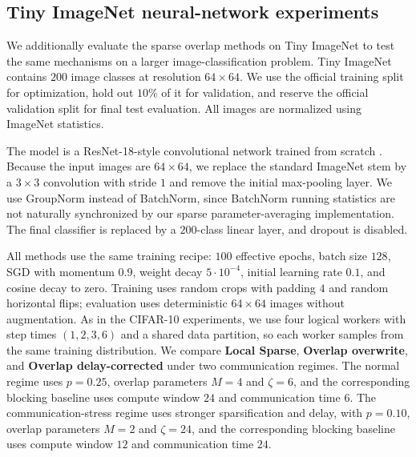 \documentclass{article}
\theoremstyle{plain}
\theoremstyle{definition}
\begin{document}
\subsection{Tiny ImageNet neural-network experiments}
\label{subsec:tiny-imagenet-neural-network}

We additionally evaluate the sparse overlap methods on Tiny ImageNet to test the same mechanisms on a larger image-classification problem.
Tiny ImageNet contains \(200\) image classes at resolution \(64\times 64\).
We use the official training split for optimization, hold out \(10\%\) of it for validation, and reserve the official validation split for final test evaluation.
All images are normalized using ImageNet statistics.

The model is a ResNet-18-style convolutional network trained from scratch \citep{he2016deep}.
Because the input images are \(64\times 64\), we replace the standard ImageNet stem by a \(3\times 3\) convolution with stride \(1\) and remove the initial max-pooling layer.
We use GroupNorm instead of BatchNorm, since BatchNorm running statistics are not naturally synchronized by our sparse parameter-averaging implementation.
The final classifier is replaced by a \(200\)-class linear layer, and dropout is disabled.

All methods use the same training recipe: \(100\) effective epochs, batch size \(128\), SGD with momentum \(0.9\), weight decay \(5\cdot 10^{-4}\), initial learning rate \(0.1\), and cosine decay to zero.
Training uses random crops with padding \(4\) and random horizontal flips; evaluation uses deterministic \(64\times 64\) images without augmentation.
As in the CIFAR-10 experiments, we use four logical workers with step times \((1,2,3,6)\) and a shared data partition, so each worker samples from the same training distribution.
We compare \textbf{Local Sparse}, \textbf{Overlap overwrite}, and \textbf{Overlap delay-corrected} under two communication regimes.
The normal regime uses \(p=0.25\), overlap parameters \(M=4\) and \(\zeta=6\), and the corresponding blocking baseline uses compute window \(24\) and communication time \(6\). 
The communication-stress regime uses stronger sparsification and delay, with \(p=0.10\), overlap parameters \(M=2\) and \(\zeta=24\), and the corresponding blocking baseline uses compute window \(12\) and communication time \(24\).
\end{document}
